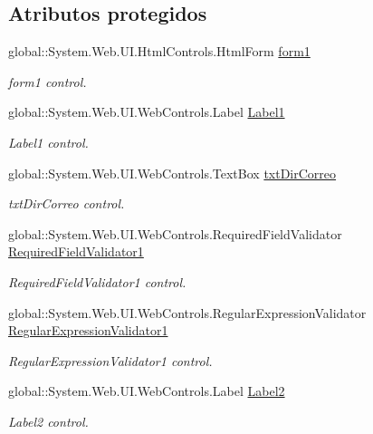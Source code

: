 \subsection*{Atributos protegidos}
\begin{DoxyCompactItemize}
\item 
global\+::\+System.\+Web.\+U\+I.\+Html\+Controls.\+Html\+Form \mbox{\hyperlink{classwebprueba_1_1_registro_a3ad67c63e60fd93af018cf83ef29c7a7}{form1}}
\begin{DoxyCompactList}\small\item\em form1 control. \end{DoxyCompactList}\item 
global\+::\+System.\+Web.\+U\+I.\+Web\+Controls.\+Label \mbox{\hyperlink{classwebprueba_1_1_registro_aa8894c18c547390f1f46081b4ddb3475}{Label1}}
\begin{DoxyCompactList}\small\item\em Label1 control. \end{DoxyCompactList}\item 
global\+::\+System.\+Web.\+U\+I.\+Web\+Controls.\+Text\+Box \mbox{\hyperlink{classwebprueba_1_1_registro_aba5344a542583708e70c49fe3a5ded0b}{txt\+Dir\+Correo}}
\begin{DoxyCompactList}\small\item\em txt\+Dir\+Correo control. \end{DoxyCompactList}\item 
global\+::\+System.\+Web.\+U\+I.\+Web\+Controls.\+Required\+Field\+Validator \mbox{\hyperlink{classwebprueba_1_1_registro_ad4a1548fbabb392bac62239ac93a2711}{Required\+Field\+Validator1}}
\begin{DoxyCompactList}\small\item\em Required\+Field\+Validator1 control. \end{DoxyCompactList}\item 
global\+::\+System.\+Web.\+U\+I.\+Web\+Controls.\+Regular\+Expression\+Validator \mbox{\hyperlink{classwebprueba_1_1_registro_a9003fdaded15daf18441dcf14d1af466}{Regular\+Expression\+Validator1}}
\begin{DoxyCompactList}\small\item\em Regular\+Expression\+Validator1 control. \end{DoxyCompactList}\item 
global\+::\+System.\+Web.\+U\+I.\+Web\+Controls.\+Label \mbox{\hyperlink{classwebprueba_1_1_registro_a6353b0bf211c3e814806c0b15f76bbf0}{Label2}}
\begin{DoxyCompactList}\small\item\em Label2 control. \end{DoxyCompactList}\item 

\end{DoxyCompactItemize}
